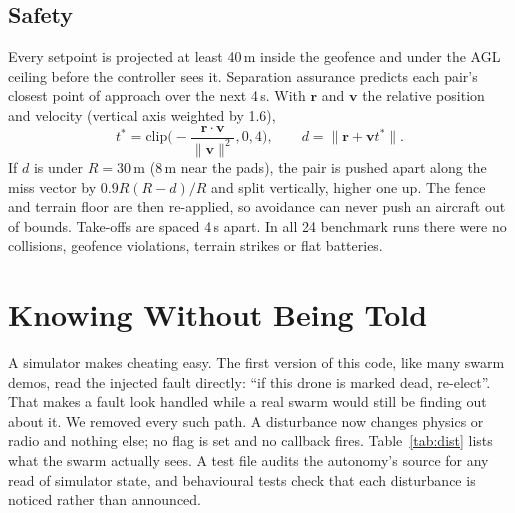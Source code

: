 \documentclass[10pt,a4paper,twocolumn]{article}
\begin{document}
\subsection{Safety}
Every setpoint is projected at least 40\,m inside the geofence and under the AGL ceiling before the controller sees it. Separation assurance predicts each pair's closest point of approach over the next 4\,s. With $\mathbf r$ and $\mathbf v$ the relative position and velocity (vertical axis weighted by 1.6),
\begin{equation}
t^\ast=\mathrm{clip}\Big(-\frac{\mathbf r\cdot\mathbf v}{\|\mathbf v\|^2},0,4\Big),\qquad d=\|\mathbf r+\mathbf v t^\ast\|.
\label{eq:cpa}
\end{equation}
If $d$ is under $R=30$\,m (8\,m near the pads), the pair is pushed apart along the miss vector by $0.9R(R-d)/R$ and split vertically, higher one up. The fence and terrain floor are then re-applied, so avoidance can never push an aircraft out of bounds. Take-offs are spaced 4\,s apart. In all 24 benchmark runs there were no collisions, geofence violations, terrain strikes or flat batteries.

\section{Knowing Without Being Told}\label{sec:scm}
A simulator makes cheating easy. The first version of this code, like many swarm demos, read the injected fault directly: ``if this drone is marked dead, re-elect''. That makes a fault look handled while a real swarm would still be finding out about it. We removed every such path. A disturbance now changes physics or radio and nothing else; no flag is set and no callback fires. Table~\ref{tab:dist} lists what the swarm actually sees. A test file audits the autonomy's source for any read of simulator state, and behavioural tests check that each disturbance is noticed rather than announced.
\end{document}
